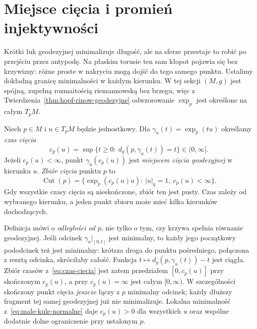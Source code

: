 \section{Miejsce cięcia i promień injektywności}
\label{sec:geodezyjne-miejsce-ciecia}

Krótki łuk geodezyjnej minimalizuje długość, ale
na sferze przestaje to robić po przejściu przez antypodę.
Na płaskim torusie ten sam kłopot pojawia się bez krzywizny:
różne proste w nakryciu mogą dojść do tego samego punktu.
Ustalimy dokładną granicę minimalności w każdym kierunku.
W tej sekcji $(M,g)$ jest spójną, zupełną rozmaitością
riemannowską bez brzegu, więc z Twierdzenia~\ref{thm:hopf-rinow-geodezyjne}
odwzorowanie $\exp_p$ jest określone na całym $T_pM$.

\begin{definicja}
\label{def:czas-miejsce-ciecia}
Niech $p\in M$ i $u\in T_pM$ będzie jednostkowy.
Dla $\gamma_u(t)=\exp_p(tu)$ określamy \emph{czas cięcia}
\begin{equation}\label{eq:czas-ciecia}
 c_p(u)=\sup\{t\geq0:\ d_g(p,\gamma_u(t))=t\}
       \in(0,\infty].
\end{equation}
Jeżeli $c_p(u)<\infty$, punkt
$\gamma_u(c_p(u))$ jest \emph{miejscem cięcia geodezyjnej}
w kierunku $u$. \emph{Zbiór cięcia} punktu $p$ to
\[
 \operatorname{Cut}(p)
 =\{\exp_p(c_p(u)u):\ |u|_g=1,\ c_p(u)<\infty\}.
\]
Gdy wszystkie czasy cięcia są nieskończone, zbiór ten
jest pusty. Czas zależy od wybranego kierunku, a jeden
punkt zbioru może mieć kilka kierunków dochodzących.
\end{definicja}

Definicja mówi o \emph{odległości od $p$}, nie tylko
o tym, czy krzywa spełnia równanie geodezyjnej.
Jeśli odcinek $\gamma_u|_{[0,t]}$ jest minimalny,
to każdy jego początkowy pododcinek też jest minimalny:
krótsza droga do punktu pośredniego, połączona z resztą
odcinka, skróciłaby całość. Funkcja
$t\mapsto d_g(p,\gamma_u(t))-t$ jest ciągła.
Zbiór czasów z~\eqref{eq:czas-ciecia} jest zatem
przedziałem $[0,c_p(u)]$ przy skończonym $c_p(u)$,
a przy $c_p(u)=\infty$ jest całym $[0,\infty)$.
W szczególności skończony punkt cięcia \emph{jeszcze}
łączy z $p$ minimalny odcinek; każdy dłuższy fragment
tej samej geodezyjnej już nie minimalizuje.
Lokalna minimalność z~\eqref{eq:male-kule-normalne}
daje $c_p(u)>0$ dla wszystkich $u$ oraz wspólne
dodatnie dolne ograniczenie przy ustalonym $p$.

